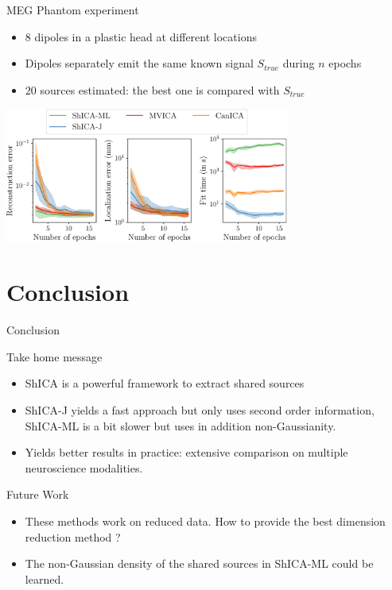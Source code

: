 \documentclass[bigger]{beamer}
\begin{document}
\begin{frame}
  \begin{block}{MEG Phantom experiment}
    \begin{itemize}
    \item 8 dipoles in a plastic head at different locations
    \item Dipoles separately emit the same known signal $S_{true}$ during $n$ epochs
    \item $20$ sources estimated: the best one is compared with $S_{true}$
    \end{itemize}
  \end{block}
  \begin{center}
    \includegraphics[width=0.7\textwidth]{./figures/meg_phantom_neurips.pdf}
  \end{center}
\end{frame}

\section{Conclusion}
\begin{frame}{Conclusion}
\begin{block}{Take home message}
\begin{itemize}
\item ShICA is a powerful framework to extract shared sources
\item ShICA-J yields a fast approach but only uses second order information,
  ShICA-ML is a bit slower but uses in addition non-Gaussianity.
\item Yields better results in practice: extensive comparison on multiple
  neuroscience modalities.
\end{itemize}
\end{block}

\begin{block}{Future Work}
\begin{itemize}
  \item These methods work on reduced data. How to provide the best dimension
    reduction method ?
  \item The non-Gaussian density of the shared sources in ShICA-ML could be learned.  
\end{itemize}
\end{block}
\end{frame}
\end{document}
